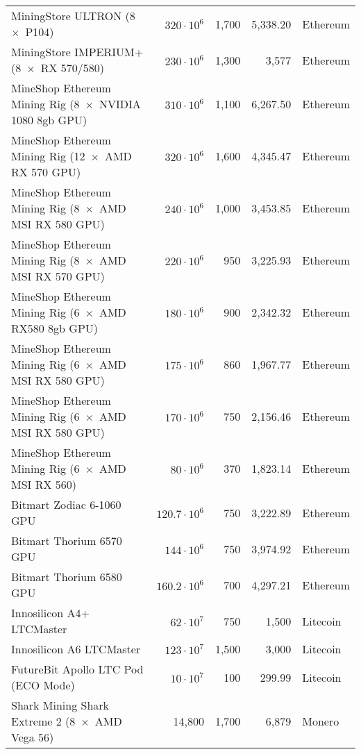 \begin{longtable}{|p{}|r|r|r|p{}|}
  MiningStore ULTRON (8~$\times$~P104)                                & $320 \cdot 10^6$ & 1,700 & 5,338.20 & Ethereum \\
  MiningStore IMPERIUM+ (8~$\times$~RX 570/580)                       & $230 \cdot 10^6$ & 1,300 & 3,577 & Ethereum \\
  MineShop Ethereum Mining Rig (8~$\times$~NVIDIA 1080 8gb GPU)       & $310 \cdot 10^6$ & 1,100 & 6,267.50 & Ethereum \\
  MineShop Ethereum Mining Rig (12~$\times$~AMD RX 570 GPU)           & $320 \cdot 10^6$ & 1,600 & 4,345.47 & Ethereum \\
  MineShop Ethereum Mining Rig (8~$\times$~AMD MSI RX 580 GPU)        & $240 \cdot 10^6$ & 1,000 & 3,453.85 & Ethereum \\
  MineShop Ethereum Mining Rig (8~$\times$~AMD MSI RX 570 GPU)        & $220 \cdot 10^6$ & 950 & 3,225.93 & Ethereum \\
  MineShop Ethereum Mining Rig (6~$\times$~AMD RX580 8gb GPU)         & $180 \cdot 10^6$ & 900 & 2,342.32 & Ethereum \\
  MineShop Ethereum Mining Rig (6~$\times$~AMD MSI RX 580 GPU)        & $175 \cdot 10^6$ & 860 & 1,967.77 & Ethereum \\
  MineShop Ethereum Mining Rig (6~$\times$~AMD MSI RX 580 GPU)        & $170 \cdot 10^6$ & 750 & 2,156.46 & Ethereum \\
  MineShop Ethereum Mining Rig (6~$\times$~AMD MSI RX 560)            & $ 80 \cdot 10^6$  & 370 & 1,823.14 & Ethereum \\
  Bitmart Zodiac 6-1060 GPU                                           & $120.7 \cdot 10^6$ & 750 & 3,222.89 & Ethereum \\
  Bitmart Thorium 6570 GPU                                            & $144 \cdot 10^6$ & 750 & 3,974.92 & Ethereum \\
  Bitmart Thorium 6580 GPU                                            & $160.2 \cdot 10^6$ & 700 & 4,297.21 & Ethereum \\
  \hline
  Innosilicon A4+ LTCMaster           & $  62 \cdot 10^7$ & 750 & 1,500 & Litecoin \\
  Innosilicon A6 LTCMaster            & $ 123 \cdot 10^7$ & 1,500 & 3,000 & Litecoin \\
  FutureBit Apollo LTC Pod (ECO Mode) & $  10 \cdot 10^7$ & 100 & 299.99 & Litecoin \\
  \hline
  Shark Mining Shark Extreme 2 (8~$\times$~AMD Vega 56) & 14,800 & 1,700 & 6,879 & Monero \\

\end{longtable}
